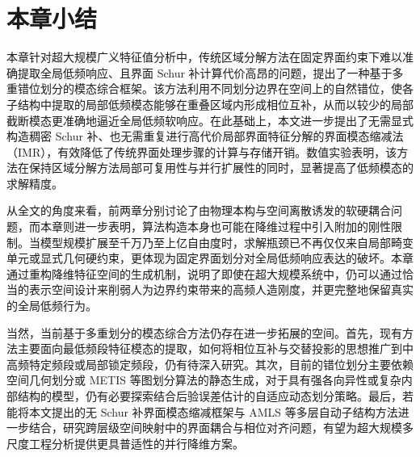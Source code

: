 
\section{本章小结}
本章针对超大规模广义特征值分析中，传统区域分解方法在固定界面约束下难以准确提取全局低频响应、且界面 Schur 补计算代价高昂的问题，提出了一种基于多重错位划分的模态综合框架。该方法利用不同划分边界在空间上的自然错位，使各子结构中提取的局部低频模态能够在重叠区域内形成相位互补，从而以较少的局部截断模态更准确地逼近全局低频软响应。在此基础上，本文进一步提出了无需显式构造稠密 Schur 补、也无需重复进行高代价局部界面特征分解的界面模态缩减法（IMR），有效降低了传统界面处理步骤的计算与存储开销。数值实验表明，该方法在保持区域分解方法局部可复用性与并行扩展性的同时，显著提高了低频模态的求解精度。

从全文的角度来看，前两章分别讨论了由物理本构与空间离散诱发的软硬耦合问题，而本章则进一步表明，算法构造本身也可能在降维过程中引入附加的刚性限制。当模型规模扩展至千万乃至上亿自由度时，求解瓶颈已不再仅仅来自局部畸变单元或显式几何硬约束，更体现为固定界面划分对全局低频响应表达的破坏。本章通过重构降维特征空间的生成机制，说明了即使在超大规模系统中，仍可以通过恰当的表示空间设计来削弱人为边界约束带来的高频人造刚度，并更完整地保留真实的全局低频行为。

当然，当前基于多重划分的模态综合方法仍存在进一步拓展的空间。首先，现有方法主要面向最低频段特征模态的提取，如何将相位互补与交替投影的思想推广到中高频特定频段或局部锁定频段，仍有待深入研究。其次，目前的错位划分主要依赖空间几何划分或 METIS 等图划分算法的静态生成，对于具有强各向异性或复杂内部结构的模型，仍有必要探索结合后验误差估计的自适应动态划分策略。最后，若能将本文提出的无 Schur 补界面模态缩减框架与 AMLS 等多层自动子结构方法进一步结合，研究跨层级空间映射中的界面耦合与相位对齐问题，有望为超大规模多尺度工程分析提供更具普适性的并行降维方案。
